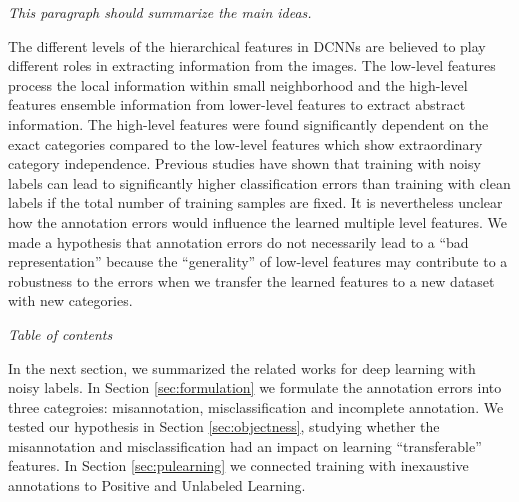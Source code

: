 \noindent
\textit{This paragraph should summarize the main ideas.}

\noindent
The different levels of the hierarchical features in DCNNs are believed to play different roles in extracting information from the images.
The low-level features process the local information within small neighborhood and the high-level features ensemble information from lower-level features to extract abstract information.
The high-level features were found significantly dependent on the exact categories compared to the low-level features which show extraordinary category independence.\cite{yosinski2014transferable}
Previous studies\cite{sukhbaatar2014training,patrini2016making} have shown that training with noisy labels can lead to significantly higher classification errors than training with clean labels if the total number of training samples are fixed.
It is nevertheless unclear how the annotation errors would influence the learned multiple level features.
We made a hypothesis that annotation errors do not necessarily lead to a ``bad representation'' because the ``generality'' of low-level features may contribute to a robustness to the errors when we transfer the learned features to a new dataset with new categories.

\noindent
\textit{Table of contents}

\noindent
In the next section, we summarized the related works for deep learning with noisy labels.
In Section \ref{sec:formulation} we formulate the annotation errors into three categroies: misannotation, misclassification and incomplete annotation.
We tested our hypothesis in Section \ref{sec:objectness}, studying whether the misannotation and misclassification had an impact on learning ``transferable'' features.
In Section \ref{sec:pulearning} we connected training with inexaustive annotations to Positive and Unlabeled Learning.


%
